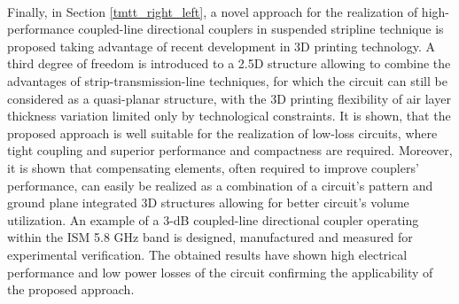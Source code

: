 \\
\indent Finally, in Section \ref{tmtt_right_left}, a novel approach for the realization of high-performance coupled-line directional couplers in suspended stripline technique is proposed taking advantage of recent development in 3D printing technology. A third degree of freedom is introduced to a 2.5D structure allowing to combine the advantages of strip-transmission-line techniques, for which the circuit can still be considered as a quasi-planar structure, with the 3D printing flexibility of air layer thickness variation limited only by technological constraints. It is shown, that the proposed approach is well suitable for the realization of low-loss circuits, where tight coupling and superior performance and compactness are required. Moreover, it is shown that compensating elements, often required to improve couplers' performance, can easily be realized as a combination of a circuit's pattern and ground plane integrated 3D structures allowing for better circuit's volume utilization. An example of a 3-dB coupled-line directional coupler operating within the ISM 5.8 GHz band is designed, manufactured and measured for experimental verification. The obtained results have shown high electrical performance and low power losses of the circuit confirming the applicability of the proposed approach.

\cleardoublepage



\cleardoublepage
 


\cleardoublepage



\cleardoublepage



\cleardoublepage